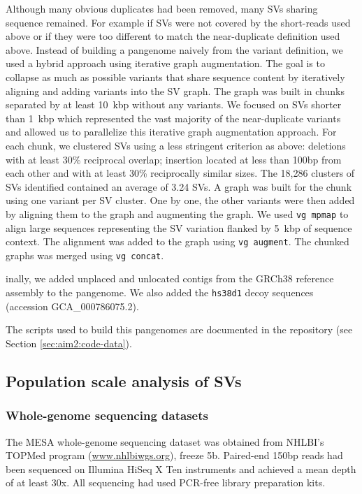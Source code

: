 \documentclass[11pt]{ucscthesis}
\begin{document}
Although many obvious duplicates had been removed, many SVs sharing sequence remained.
For example if SVs were not covered by the short-reads used above or if they were too different to match the near-duplicate definition used above.
Instead of building a pangenome naively from the variant definition, we used a hybrid approach using iterative graph augmentation.
The goal is to collapse as much as possible variants that share sequence content by iteratively aligning and adding variants into the SV graph.
The graph was built in chunks separated by at least 10~kbp without any variants.
We focused on SVs shorter than 1~kbp which represented the vast majority of the near-duplicate variants and allowed us to parallelize this iterative graph augmentation approach.
For each chunk, we clustered SVs using a less stringent criterion as above: deletions with at least 30\% reciprocal overlap; insertion located at less than 100bp from each other and with at least 30\% reciprocally similar sizes.
The 18,286 clusters of SVs identified contained an average of 3.24 SVs.
A graph was built for the chunk using one variant per SV cluster.
One by one, the other variants were then added by aligning them to the graph and augmenting the graph.
We used \texttt{vg~mpmap} \cite{sibbesen2021haplotype} to align large sequences representing the SV variation flanked by 5~kbp of sequence context.
The alignment was added to the graph using \texttt{vg~augment}.
The chunked graphs was merged using \texttt{vg~concat}.

inally, we added unplaced and unlocated contigs from the GRCh38 reference assembly to the pangenome.
We also added the \texttt{hs38d1} decoy sequences (accession GCA\_000786075.2).

The scripts used to build this pangenomes are documented in the repository (see Section \ref{sec:aim2:code-data}).

\subsection{Population scale analysis of SVs}

\subsubsection{Whole-genome sequencing datasets}

The MESA whole-genome sequencing dataset was obtained from NHLBI’s TOPMed program (\url{www.nhlbiwgs.org}), freeze 5b.
Paired-end 150bp reads had been sequenced on Illumina HiSeq X Ten instruments and achieved a mean depth of at least 30x.
All sequencing had used PCR-free library preparation kits.
\end{document}
